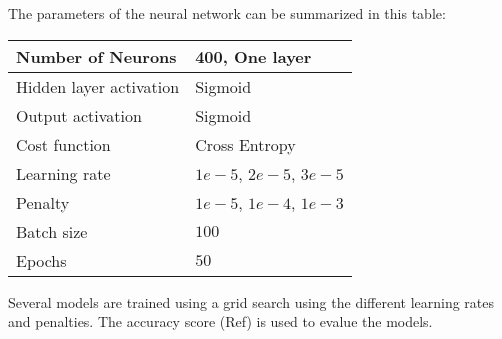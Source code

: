 The parameters of the neural network can be summarized in this table:

\begin{table}[H]
\begin{tabular}{|l|l|}
\hline
Number of Neurons & 400, One layer  \\ \hline
Hidden layer activation & Sigmoid   \\ \hline
Output activation & Sigmoid  \\ \hline
Cost function & Cross Entropy \\ \hline
Learning rate & $1e-5$, $2e-5$, $3e-5$  \\ \hline
Penalty & $1e-5$, $1e-4$, $1e-3$  \\ \hline
Batch size & $100$  \\ \hline
Epochs & $50$  \\ \hline
\end{tabular}
\end{table}

Several models are trained using a grid search using the different learning rates 
and penalties. The accuracy score (Ref) is used to evalue the models.
